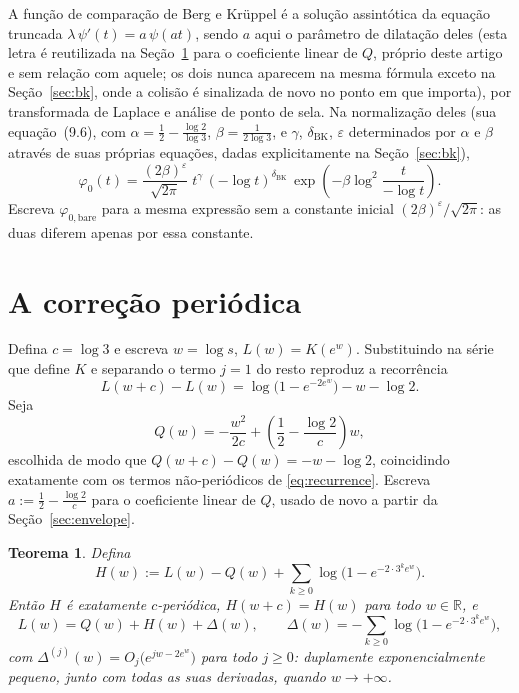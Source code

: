 \documentclass[11pt]{amsart}
\theoremstyle{plain}
\newtheorem{theorem}{Teorema}
\theoremstyle{definition}
\theoremstyle{remark}
\newcommand{\R}{\mathbb{R}}
\begin{document}
A função de comparação de Berg e Kr\"uppel é a solução assintótica da equação truncada
$\lambda\, \psi'(t) = a\, \psi(at)$, sendo $a$ aqui o parâmetro de dilatação deles (esta letra é
reutilizada na Seção~\ref{sec:periodic} para o coeficiente linear de $Q$, próprio deste artigo e
sem relação com aquele; os dois nunca aparecem na mesma fórmula exceto na Seção~\ref{sec:bk}, onde
a colisão é sinalizada de novo no ponto em que importa), por transformada de Laplace e análise de
ponto de sela. Na normalização deles (sua equação~(9.6), com
$\alpha = \tfrac12 - \tfrac{\log 2}{\log 3}$, $\beta = \tfrac{1}{2\log 3}$, e $\gamma$,
$\delta_{\mathrm{BK}}$, $\varepsilon$ determinados por $\alpha$ e $\beta$ através de suas próprias
equações, dadas explicitamente na Seção~\ref{sec:bk}),
\[
\varphi_0(t) = \frac{(2\beta)^\varepsilon}{\sqrt{2\pi}}\; t^\gamma\,(-\log t)^{\delta_{\mathrm{BK}}}
\, \exp\!\left(-\beta \log^2\!\frac{t}{-\log t}\right).
\]
Escreva $\varphi_{0,\mathrm{bare}}$ para a mesma expressão sem a constante inicial
$(2\beta)^\varepsilon/\sqrt{2\pi}$: as duas diferem apenas por essa constante.

\section{A correção periódica}
\label{sec:periodic}

Defina $c = \log 3$ e escreva $w = \log s$, $L(w) = K(e^w)$. Substituindo na série que define $K$ e
separando o termo $j=1$ do resto reproduz a recorrência
\begin{equation}
\label{eq:recurrence}
L(w+c) - L(w) = \log\bigl(1 - e^{-2e^w}\bigr) - w - \log 2.
\end{equation}
Seja
\[
Q(w) = -\frac{w^2}{2c} + \left(\frac12 - \frac{\log 2}{c}\right) w,
\]
escolhida de modo que $Q(w+c) - Q(w) = -w-\log2$, coincidindo exatamente com os termos
não-periódicos de \eqref{eq:recurrence}. Escreva $a := \tfrac12 - \tfrac{\log 2}{c}$ para o
coeficiente linear de $Q$, usado de novo a partir da Seção~\ref{sec:envelope}.

\begin{theorem}
\label{thm:H}
Defina
\begin{equation}
\label{eq:Hexact}
H(w) := L(w) - Q(w) + \sum_{k \ge 0} \log\bigl(1 - e^{-2\cdot 3^k e^w}\bigr).
\end{equation}
Então $H$ é exatamente $c$-periódica, $H(w+c) = H(w)$ para todo $w \in \R$, e
\[
L(w) = Q(w) + H(w) + \Delta(w), \qquad \Delta(w) = -\sum_{k\ge 0}\log\bigl(1-e^{-2\cdot3^k e^w}\bigr),
\]
com $\Delta^{(j)}(w) = O_j\bigl(e^{jw - 2e^w}\bigr)$ para todo $j \ge 0$: duplamente
exponencialmente pequeno, junto com todas as suas derivadas, quando $w \to +\infty$.
\end{theorem}
\end{document}
